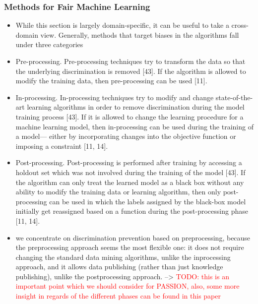 \documentclass[12pt, a4paper, oneside]{book}   	%
\renewcommand{\todo}[1]{\textcolor{red}{TODO: #1}}
\renewcommand{\paragraph}[1]{%
	\subsubsection*{#1}%
}
\begin{document}
			\paragraph{Methods for Fair Machine Learning}
			\begin{itemize}
				\item While this section is largely domain-specific, it can be useful to take a cross-domain view. Generally, methods that target biases in the algorithms fall under three categories \autocite{Mehrabi_2021}
				\item Pre-processing. Pre-processing techniques try to transform the data so that the underlying discrimination is removed [43]. If the algorithm is allowed to modify the training data, then pre-processing can be used [11].\autocite{Mehrabi_2021}
				\item In-processing. In-processing techniques try to modify and change state-of-the-art learning algorithms in order to remove discrimination during the model training process [43]. If it is allowed to change the learning procedure for a machine learning model, then in-processing can be used during the training of a model— either by incorporating changes into the objective function or imposing a constraint [11, 14].\autocite{Mehrabi_2021}
				\item Post-processing. Post-processing is performed after training by accessing a holdout set which was not involved during the training of the model [43]. If the algorithm can only treat the learned model as a black box without any ability to modify the training data or learning algorithm, then only post-processing can be used in which the labels assigned by the black-box model initially get reassigned based on a function during the post-processing phase [11, 14].\autocite{Mehrabi_2021}
				\item we concentrate on discrimination prevention based on preprocessing, because the preprocessing approach seems the most flexible one: it does not require changing the standard data mining algorithms, unlike the inprocessing approach, and it allows data publishing (rather than just knowledge publishing), unlike the postprocessing approach. \autocite{M62_Hajian_2013} --> \todo{this is an important point which we should consider for PASSION, also, some more insight in regards of the different phases can be found in this paper}
				

\end{itemize}
\end{document}
